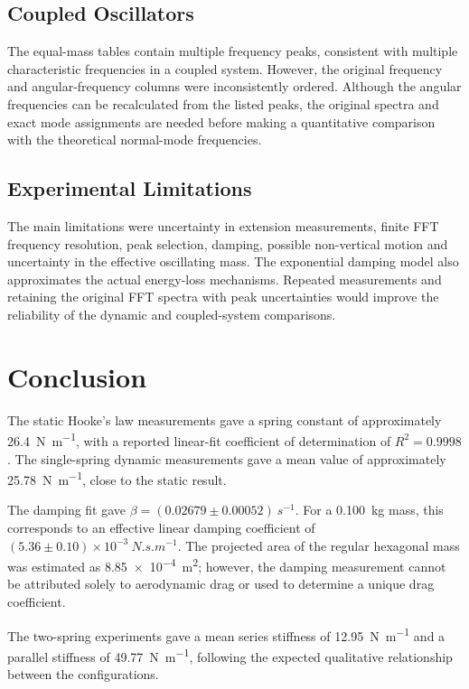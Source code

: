 \documentclass[12pt,a4paper]{article}
\begin{document}
\subsection{Coupled Oscillators}

The equal-mass tables contain multiple frequency peaks, consistent with multiple characteristic frequencies in a coupled system. However, the original frequency and angular-frequency columns were inconsistently ordered. Although the angular frequencies can be recalculated from the listed peaks, the original spectra and exact mode assignments are needed before making a quantitative comparison with the theoretical normal-mode frequencies.


\subsection{Experimental Limitations}

The main limitations were uncertainty in extension measurements, finite FFT frequency resolution, peak selection, damping, possible non-vertical motion and uncertainty in the effective oscillating mass. The exponential damping model also approximates the actual energy-loss mechanisms. Repeated measurements and retaining the original FFT spectra with peak uncertainties would improve the reliability of the dynamic and coupled-system comparisons.

\section{Conclusion}

The static Hooke's law measurements gave a spring constant of approximately \SI{26.4}{N.m^{-1}}, with a reported linear-fit coefficient of determination of $R^2=0.9998$. The single-spring dynamic measurements gave a mean value of approximately \SI{25.78}{N.m^{-1}}, close to the static result.

The damping fit gave $\beta=(0.02679\pm0.00052)\ \si{s^{-1}}$. For a \SI{0.100}{kg} mass, this corresponds to an effective linear damping coefficient of $(5.36\pm0.10)\times10^{-3}\ \si{N.s.m^{-1}}$. The projected area of the regular hexagonal mass was estimated as \SI{8.85e-4}{m^2}; however, the damping measurement cannot be attributed solely to aerodynamic drag or used to determine a unique drag coefficient.

The two-spring experiments gave a mean series stiffness of \SI{12.95}{N.m^{-1}} and a parallel stiffness of \SI{49.77}{N.m^{-1}}, following the expected qualitative relationship between the configurations.
\end{document}
